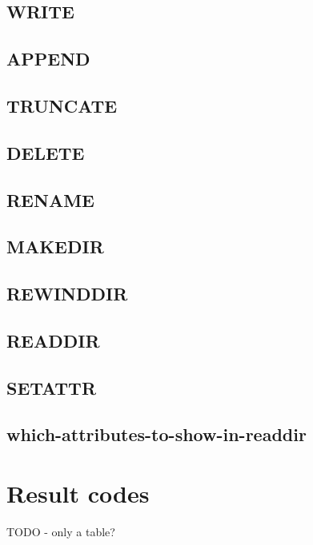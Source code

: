 \subsection{WRITE}

\subsection{APPEND}

\subsection{TRUNCATE}

\subsection{DELETE}

\subsection{RENAME}

\subsection{MAKEDIR}

\subsection{REWINDDIR}

\subsection{READDIR}

\subsection{SETATTR}

\subsection{which-attributes-to-show-in-readdir}


\section{Result codes}

TODO - only a table?


